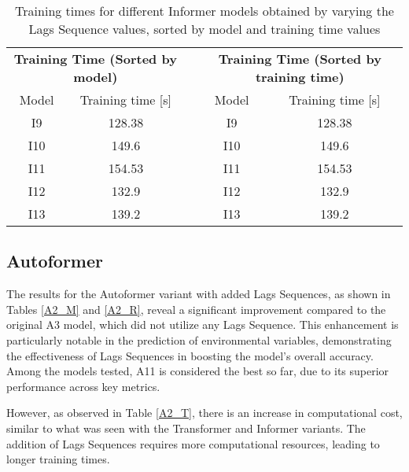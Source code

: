 \begin{table}[]
    \begin{tabular}{ccccc}
    \multicolumn{2}{c}{\textbf{Training   Time (Sorted by model)}} &  & \multicolumn{2}{c}{\textbf{Training Time (Sorted   by training time)}} \\
    Model             & Training time {[}s{]}                      &  & Model                 & Training time {[}s{]}                          \\
    I9                & \cellcolor[HTML]{63BE7B}128.38             &  & I9                    & \cellcolor[HTML]{63BE7B}128.38                 \\
    I10               & \cellcolor[HTML]{FB9374}149.6              &  & I10                   & \cellcolor[HTML]{FB9374}149.6                  \\
    I11               & \cellcolor[HTML]{F8696B}154.53             &  & I11                   & \cellcolor[HTML]{F8696B}154.53                 \\
    I12               & \cellcolor[HTML]{A4D07E}132.9              &  & I12                   & \cellcolor[HTML]{A4D07E}132.9                  \\
    I13               & \cellcolor[HTML]{FFEB84}139.2              &  & I13                   & \cellcolor[HTML]{FFEB84}139.2                 
    \end{tabular}
    \caption{Training times for different Informer models obtained  by varying the Lags Sequence values, sorted by model and training time values}
    \label{I2_T}
    \end{table}



\subsection{Autoformer}
The results for the Autoformer variant with added Lags Sequences, as shown in Tables \ref{A2_M} and \ref{A2_R}, reveal a significant improvement compared to the original A3 model, which did not utilize any Lags Sequence. This enhancement is particularly notable in the prediction of environmental variables, demonstrating the effectiveness of Lags Sequences in boosting the model's overall accuracy. Among the models tested, A11 is considered the best so far, due to its superior performance across key metrics.

However, as observed in Table \ref{A2_T}, there is an increase in computational cost, similar to what was seen with the Transformer and Informer variants. The addition of Lags Sequences requires more computational resources, leading to longer training times.



